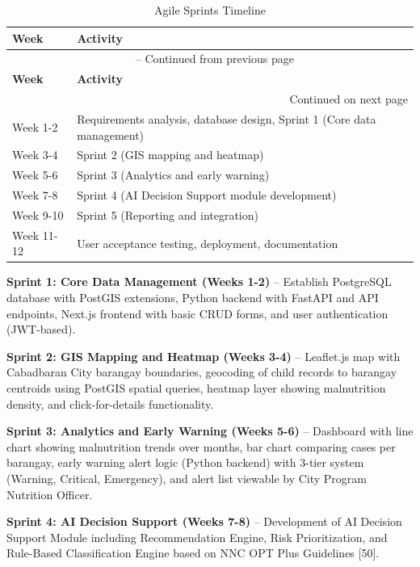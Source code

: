 \documentclass[12pt, a4paper]{report}
\begin{document}
\vspace{0.3cm}
\begin{longtable}{p{3cm} p{11cm}}
    \caption{Agile Sprints Timeline} \label{tab:agile_timeline} \\
    \toprule
    \textbf{Week} & \textbf{Activity} \\
    \midrule
    \endfirsthead
    \multicolumn{2}{c}{{\tablename\ \thetable{} -- Continued from previous page}} \\
    \toprule
    \textbf{Week} & \textbf{Activity} \\
    \midrule
    \endhead
    \midrule
    \multicolumn{2}{r}{{Continued on next page}} \\
    \endfoot
    \bottomrule
    \endlastfoot
    Week 1-2 & Requirements analysis, database design, Sprint 1 (Core data management) \\
    \addlinespace
    Week 3-4 & Sprint 2 (GIS mapping and heatmap) \\
    \addlinespace
    Week 5-6 & Sprint 3 (Analytics and early warning) \\
    \addlinespace
    Week 7-8 & Sprint 4 (AI Decision Support module development) \\
    \addlinespace
    Week 9-10 & Sprint 5 (Reporting and integration) \\
    \addlinespace
    Week 11-12 & User acceptance testing, deployment, documentation \\
\end{longtable}
\vspace{0.3cm}

\textbf{Sprint 1: Core Data Management (Weeks 1-2)} -- Establish PostgreSQL database with PostGIS extensions, Python backend with FastAPI and API endpoints, Next.js frontend with basic CRUD forms, and user authentication (JWT-based).

\textbf{Sprint 2: GIS Mapping and Heatmap (Weeks 3-4)} -- Leaflet.js map with Cabadbaran City barangay boundaries, geocoding of child records to barangay centroids using PostGIS spatial queries, heatmap layer showing malnutrition density, and click-for-details functionality.

\textbf{Sprint 3: Analytics and Early Warning (Weeks 5-6)} -- Dashboard with line chart showing malnutrition trends over months, bar chart comparing cases per barangay, early warning alert logic (Python backend) with 3-tier system (Warning, Critical, Emergency), and alert list viewable by City Program Nutrition Officer.

\textbf{Sprint 4: AI Decision Support (Weeks 7-8)} -- Development of AI Decision Support Module including Recommendation Engine, Risk Prioritization, and Rule-Based Classification Engine based on NNC OPT Plus Guidelines [50].
\end{document}
